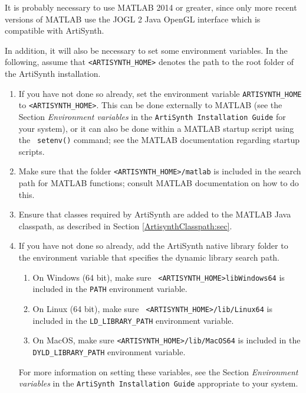 \documentclass{article}
\begin{document}
It is probably necessary to use MATLAB 2014 or greater, since only
more recent versions of MATLAB use the JOGL 2 Java OpenGL interface
which is compatible with ArtiSynth.

In addition, it will also be necessary to set some environment
variables. In the following, assume that {\tt <ARTISYNTH\_HOME>} denotes
the path to the root folder of the ArtiSynth installation.

\begin{enumerate}

\item If you have not done so already, set the environment variable
{\tt ARTISYNTH\_HOME} to {\tt <ARTISYNTH\_HOME>}. This can be done
externally to MATLAB (see the Section {\it Environment variables} in
the {\tt ArtiSynth Installation Guide} for your system), or
it can also be done within a MATLAB startup script using the {\tt
setenv()} command; see the MATLAB documentation regarding startup scripts.

\item Make sure that the folder {\tt <ARTISYNTH\_HOME>/matlab} is
included in the search path for MATLAB functions; consult MATLAB
documentation on how to do this.

\item Ensure that classes required by ArtiSynth are added
to the MATLAB Java classpath, as described in Section
\ref{ArtisynthClasspath:sec}.

\item If you have not done so already, add the ArtiSynth native
library folder to the environment variable that specifies the dynamic
library search path. 

\begin{enumerate}

\item On Windows (64 bit), make sure {\tt
<ARTISYNTH\_HOME>\BKS lib\BKS Windows64} is included in the {\tt PATH}
environment variable.

\item On Linux (64 bit), make sure {\tt
<ARTISYNTH\_HOME>/lib/Linux64} is included in the {\tt LD\_LIBRARY\_PATH}
environment variable.

\item On MacOS, make sure {\tt <ARTISYNTH\_HOME>/lib/MacOS64} is
included in the {\tt DYLD\_LIBRARY\_PATH} environment variable.

\end{enumerate}

For more information on setting these variables, see the Section {\it
Environment variables} in the {\tt ArtiSynth Installation Guide}
appropriate to your system.


\end{enumerate}
\end{document}
